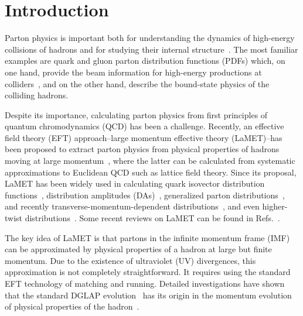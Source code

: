 \section{Introduction}
\label{sec:intro}

Parton physics is important both for understanding the dynamics of
high-energy collisions of hadrons and for studying their
internal structure~\cite{Ellis:1991qj,Thomas:2001kw}. The most familiar examples
are quark and gluon parton distribution functions (PDFs)
which, on one hand, provide the beam information for
high-energy productions at colliders~\cite{Gao:2017yyd}, and on the other hand,
describe the bound-state physics of the colliding hadrons.

Despite its importance, calculating parton physics from first principles of
quantum chromodynamics (QCD) has been a challenge. Recently,
an effective field theory (EFT) approach--large momentum effective theory (LaMET)--has been proposed to extract parton physics from physical properties
of hadrons moving at large momentum~\cite{Ji:2013dva,Ji:2014gla}, where the latter
can be calculated from systematic approximations to Euclidean QCD such
as lattice field theory. Since its proposal, LaMET has been widely used in calculating quark isovector distribution functions~\cite{Lin:2014zya,Alexandrou:2015rja,Chen:2016utp,Alexandrou:2016jqi,Alexandrou:2018pbm,Chen:2018xof,Lin:2018qky,Liu:2018uuj,Alexandrou:2018eet,Liu:2018hxv,Chen:2018fwa,Izubuchi:2019lyk,Shugert:2020tgq,Chai:2020nxw,Lin:2020ssv,Fan:2020nzz}, distribution amplitudes (DAs)~\cite{Zhang:2017bzy,Chen:2017gck,Zhang:2020gaj},
generalized parton distributions~\cite{Chen:2019lcm,Alexandrou:2019dax}, and recently transverse-momentum-dependent
distributions~\cite{Shanahan:2019zcq,Shanahan:2020zxr,Zhang:2020dbb}, and even higher-twist distributions~\cite{Bhattacharya:2020cen}. Some recent reviews on
LaMET can be found in Refs.~\cite{Ji:2020ect,Cichy:2018mum}.

The key idea of LaMET is that partons in the infinite momentum frame (IMF)
can be approximated by physical properties of a hadron at large but
finite momentum. Due to the existence of ultraviolet (UV) divergences, this approximation
is not completely straightforward. It requires using the standard EFT technology of matching and running. Detailed investigations have shown that the standard DGLAP evolution~\cite{Dokshitzer:1977sg,Gribov:1972ri,Altarelli:1977zs} has its origin in the momentum evolution of physical properties of the hadron~\cite{Ji:2020ect}.

